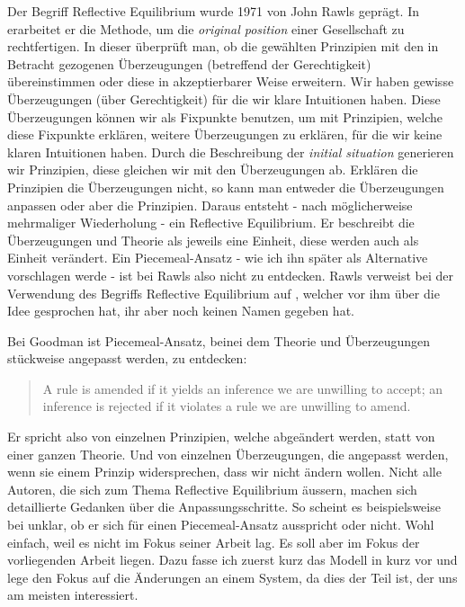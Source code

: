 \documentclass{article}
\begin{document}
Der Begriff Reflective Equilibrium wurde 1971 von John Rawls geprägt. In \autocite{rawls_theory_1971} erarbeitet er die Methode, um die \textit{original position} einer Gesellschaft zu rechtfertigen. In dieser überprüft man, ob die gewählten Prinzipien mit den in Betracht gezogenen Überzeugungen (betreffend der Gerechtigkeit) übereinstimmen oder diese in akzeptierbarer Weise erweitern. Wir haben gewisse Überzeugungen (über Gerechtigkeit) für die wir klare Intuitionen haben. Diese Überzeugungen können wir als Fixpunkte benutzen, um mit Prinzipien, welche diese Fixpunkte erklären, weitere Überzeugungen zu erklären, für die wir keine klaren Intuitionen haben. Durch die Beschreibung der \textit{initial situation} generieren wir Prinzipien, diese gleichen wir mit den Überzeugungen ab. Erklären die Prinzipien die Überzeugungen nicht, so kann man entweder die Überzeugungen anpassen oder aber die Prinzipien. Daraus entsteht - nach möglicherweise mehrmaliger Wiederholung - ein Reflective Equilibrium. Er beschreibt die Überzeugungen und Theorie als jeweils eine Einheit, diese werden auch als Einheit verändert. Ein Piecemeal-Ansatz - wie ich ihn später als Alternative vorschlagen werde - ist bei Rawls also nicht zu entdecken. Rawls verweist bei der Verwendung des Begriffs Reflective Equilibrium auf \cite{goodman_fact_1983}, welcher vor ihm über die Idee gesprochen hat, ihr aber noch keinen Namen gegeben hat. \autocite[S.~20]{rawls_theory_1971}

Bei Goodman ist  Piecemeal-Ansatz, beinei dem Theorie und Überzeugungen stückweise angepasst werden, zu entdecken:

\begin{quote}
    A rule is amended if it yields an inference we are unwilling to accept; an inference is rejected if it violates a rule we are unwilling to amend. \autocite[S.~64]{goodman_fact_1983}
\end{quote}

Er spricht also von einzelnen Prinzipien, welche abgeändert werden, statt von einer ganzen Theorie. Und von einzelnen Überzeugungen, die angepasst werden, wenn sie einem Prinzip widersprechen, dass wir nicht ändern wollen. Nicht alle Autoren, die sich zum Thema Reflective Equilibrium äussern, machen sich detaillierte Gedanken über die Anpassungsschritte. So scheint es beispielsweise bei \autocite{tersman_reflective_1993} unklar, ob er sich für einen Piecemeal-Ansatz ausspricht oder nicht. Wohl einfach, weil es nicht im Fokus seiner Arbeit lag. Es soll aber im Fokus der vorliegenden Arbeit liegen. Dazu fasse ich zuerst kurz das Modell in \autocite{beisbart_making_2021} kurz vor und lege den Fokus auf die Änderungen an einem System, da dies der Teil ist, der uns am meisten interessiert.
\end{document}
